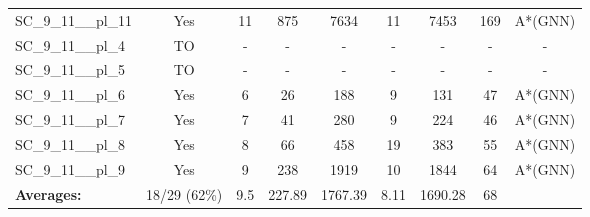 \documentclass{article}
\begin{document}
\begin{tabular}{lcccccccc}
SC\_9\_11\_\_pl\_11 & Yes & 11 & 875 & 7634 & 11 & 7453 & 169 & A*(GNN) \\
SC\_9\_11\_\_pl\_4 & TO & - & - & - & - & - & - & - \\
SC\_9\_11\_\_pl\_5 & TO & - & - & - & - & - & - & - \\
SC\_9\_11\_\_pl\_6 & Yes & 6 & 26 & 188 & 9 & 131 & 47 & A*(GNN) \\
SC\_9\_11\_\_pl\_7 & Yes & 7 & 41 & 280 & 9 & 224 & 46 & A*(GNN) \\
SC\_9\_11\_\_pl\_8 & Yes & 8 & 66 & 458 & 19 & 383 & 55 & A*(GNN) \\
SC\_9\_11\_\_pl\_9 & Yes & 9 & 238 & 1919 & 10 & 1844 & 64 & A*(GNN) \\
\textbf{Averages:} & 18/29 (62\%) & 9.5 & 227.89 & 1767.39 & 8.11 & 1690.28 & 68 & \\
\bottomrule
\end{tabular}
\\[0.7cm]
\end{document}
